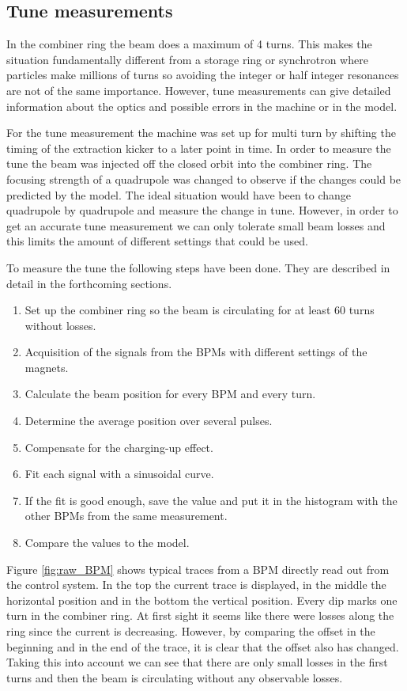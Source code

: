 \subsection{Tune measurements}

In the combiner ring the beam does a maximum of 4 turns. 
This makes the situation fundamentally different from a storage ring or 
synchrotron where particles make millions of turns so avoiding the integer or 
half integer resonances are not of the same importance. 
However, tune measurements can give detailed information about the optics and 
possible errors in the machine or in the model.

For the tune measurement the machine was set up for multi turn by shifting 
the timing of the extraction kicker to a later point in time. 
In order to measure the tune the beam was injected 
off the closed orbit into the combiner ring. 
The focusing strength of a quadrupole was changed to observe 
if the changes could be predicted by the model. 
The ideal situation would have been to change quadrupole by 
quadrupole and measure the change in tune.
However, in order to get an accurate tune measurement 
we can only tolerate small beam losses and 
this limits the amount of different settings that could be used.


To measure the tune the following steps have been done. 
They are described in detail in the forthcoming sections.
\begin{enumerate}
\item
Set up the combiner ring so the beam is circulating for at least 60 turns 
without losses.
\item
Acquisition of the signals from the BPMs with different settings of the magnets.
\item
Calculate the beam position for every BPM and every turn.
\item
Determine the average position over several pulses.
\item
Compensate for the charging-up effect.
\item
Fit each signal with a sinusoidal curve.
\item
If the fit is good enough, save the value and put it in the histogram with 
the other BPMs from the same measurement.
\item
Compare the values to the model.
\end{enumerate}


 
Figure \ref{fig:raw_BPM} shows typical traces from a BPM directly read out 
from the control system. In the top the current trace is displayed, 
in the middle the horizontal position and in the bottom the vertical position. 
Every dip marks one turn in the combiner ring. 
At first sight it seems like there were losses along the ring 
since the current is decreasing. 
However, by comparing the offset in the beginning and in the end of the trace, 
it is clear that the offset also has changed. 
Taking this into account we can see that there are only small losses 
in the first turns and then the beam is circulating without any observable losses.

